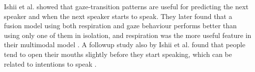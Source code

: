 \documentclass[sigconf]{acmart}
\begin{document}
Ishii et al. showed that gaze-transition patterns are useful for predicting the next speaker and when the next speaker starts to speak. They later found that a fusion model using both respiration and gaze behaviour performs better than using only one of them in isolation, and respiration was the more useful feature in their multimodal model \cite{ishii2015multimodal}. A followup study also by Ishii et al. found that people tend to open their mouths slightly before they start speaking, which can be related to intentions to speak \cite{mouth_open_patterns}. 

\end{document}
